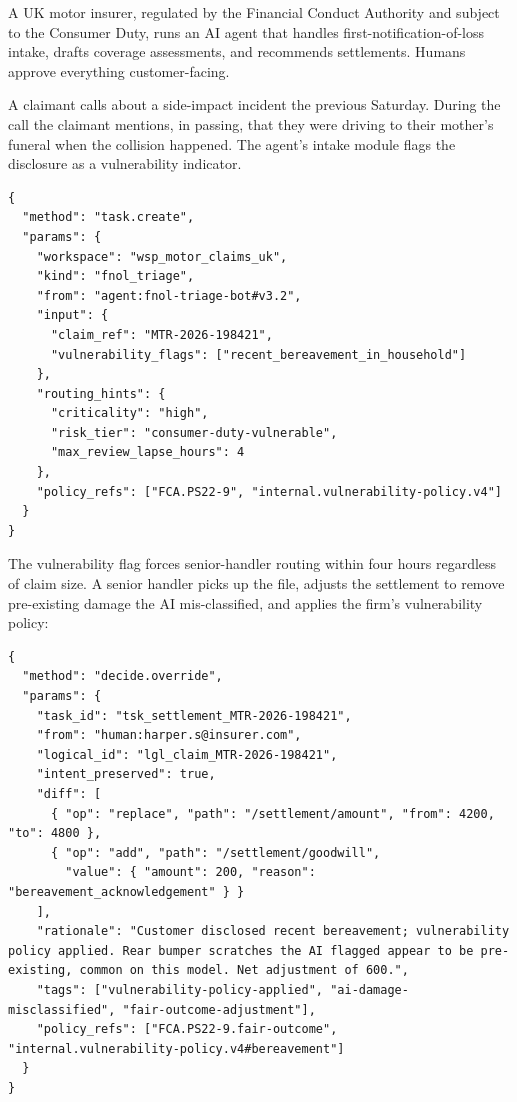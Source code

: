 \documentclass[11pt]{article}
\begin{document}
A UK motor insurer, regulated by the Financial Conduct Authority and subject to the Consumer Duty, runs an AI agent that handles first-notification-of-loss intake, drafts coverage assessments, and recommends settlements. Humans approve everything customer-facing.

A claimant calls about a side-impact incident the previous Saturday. During the call the claimant mentions, in passing, that they were driving to their mother's funeral when the collision happened. The agent's intake module flags the disclosure as a vulnerability indicator.

\begin{lstlisting}[caption={Vulnerability-aware claim triage.},label={lst:case11-fnol}]
{
  "method": "task.create",
  "params": {
    "workspace": "wsp_motor_claims_uk",
    "kind": "fnol_triage",
    "from": "agent:fnol-triage-bot#v3.2",
    "input": {
      "claim_ref": "MTR-2026-198421",
      "vulnerability_flags": ["recent_bereavement_in_household"]
    },
    "routing_hints": {
      "criticality": "high",
      "risk_tier": "consumer-duty-vulnerable",
      "max_review_lapse_hours": 4
    },
    "policy_refs": ["FCA.PS22-9", "internal.vulnerability-policy.v4"]
  }
}
\end{lstlisting}

The vulnerability flag forces senior-handler routing within four hours regardless of claim size. A senior handler picks up the file, adjusts the settlement to remove pre-existing damage the AI mis-classified, and applies the firm's vulnerability policy:

\begin{lstlisting}[caption={Senior-handler override applying vulnerability policy.},label={lst:case11-override}]
{
  "method": "decide.override",
  "params": {
    "task_id": "tsk_settlement_MTR-2026-198421",
    "from": "human:harper.s@insurer.com",
    "logical_id": "lgl_claim_MTR-2026-198421",
    "intent_preserved": true,
    "diff": [
      { "op": "replace", "path": "/settlement/amount", "from": 4200, "to": 4800 },
      { "op": "add", "path": "/settlement/goodwill",
        "value": { "amount": 200, "reason": "bereavement_acknowledgement" } }
    ],
    "rationale": "Customer disclosed recent bereavement; vulnerability policy applied. Rear bumper scratches the AI flagged appear to be pre-existing, common on this model. Net adjustment of 600.",
    "tags": ["vulnerability-policy-applied", "ai-damage-misclassified", "fair-outcome-adjustment"],
    "policy_refs": ["FCA.PS22-9.fair-outcome", "internal.vulnerability-policy.v4#bereavement"]
  }
}
\end{lstlisting}
\end{document}
